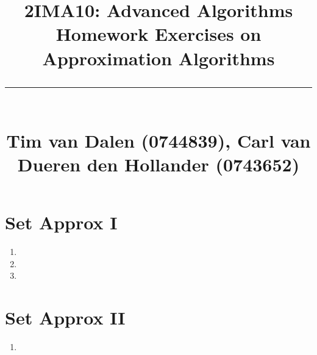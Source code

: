 \documentclass[a4paper,11pt]{article}
\title{
	\huge\raggedright 2IMA10: Advanced Algorithms \hfill\\{\Large Homework Exercises on Approximation Algorithms}\\ \vspace{-0.9\baselineskip}\rule{\linewidth}{1pt}\\
	\small\hfill Tim van Dalen (0744839), Carl van Dueren den Hollander (0743652)
	\normalsize
}
\begin{document}
	\maketitle

	\section*{Set Approx I}
		\begin{enumerate}
			\item 
			\item 
			\item 
		\end{enumerate}
	\section*{Set Approx II}
		\begin{enumerate}
			\item 
		\end{enumerate}
\end{document}

